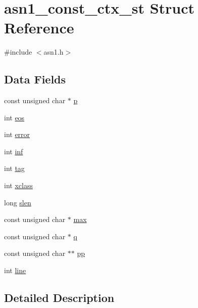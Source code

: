 \hypertarget{structasn1__const__ctx__st}{}\section{asn1\+\_\+const\+\_\+ctx\+\_\+st Struct Reference}
\label{structasn1__const__ctx__st}


{\ttfamily \#include $<$asn1.\+h$>$}

\subsection*{Data Fields}
\begin{DoxyCompactItemize}
\item 
const unsigned char $\ast$ \hyperlink{structasn1__const__ctx__st_ae329a214f7e2e08dfa26a10e01466df9}{p}
\item 
int \hyperlink{structasn1__const__ctx__st_a361b5c8443971a7dbab5f334babedaed}{eos}
\item 
int \hyperlink{structasn1__const__ctx__st_a11614f44ef4d939bdd984953346a7572}{error}
\item 
int \hyperlink{structasn1__const__ctx__st_a0726229cd75e3b3be1d6e3c8fccacb87}{inf}
\item 
int \hyperlink{structasn1__const__ctx__st_aab34f2fc02b4a86bea93c68e1ec09d75}{tag}
\item 
int \hyperlink{structasn1__const__ctx__st_aa80351b0a17519e53a90e18c92ca7945}{xclass}
\item 
long \hyperlink{structasn1__const__ctx__st_ac86d4f0cab60f9deb74badbd7f64014c}{slen}
\item 
const unsigned char $\ast$ \hyperlink{structasn1__const__ctx__st_ab0f0153c9ad37a487635fa41e9bab986}{max}
\item 
const unsigned char $\ast$ \hyperlink{structasn1__const__ctx__st_af0cf94d7bf6ad965815c9265c762831a}{q}
\item 
const unsigned char $\ast$$\ast$ \hyperlink{structasn1__const__ctx__st_a3fbceb40ae8245599c29fb3ba118fb2f}{pp}
\item 
int \hyperlink{structasn1__const__ctx__st_a41ebd28ef1d7c6ade45642cb6acc1039}{line}
\end{DoxyCompactItemize}


\subsection{Detailed Description}


